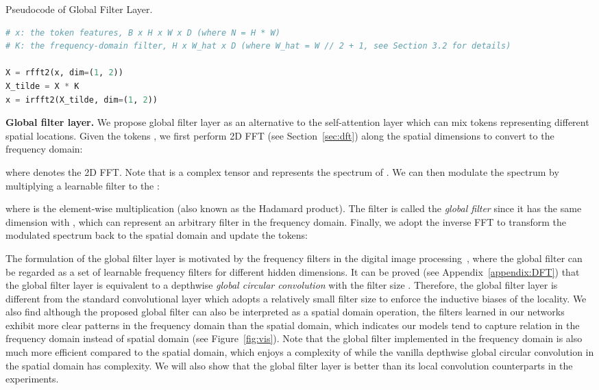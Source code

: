 \documentclass{article}
\makeatletter
\numberwithin{equation}{section}
\newcommand{\paragrapha}[2][1pt]{\vspace{#1}\noindent\textbf{#2}}
\let\@algcomment\relax
\newcommand\algcomment[1]{\def\@algcomment{\footnotesize#1}}
\makeatother
\begin{document}
\begin{algorithm}[t]
\caption{Pseudocode of Global Filter Layer.}
\label{alg:code}
\algcomment{\fontsize{7.2pt}{0em}\selectfont \texttt{rfft2/irfft2}: 2D FFT/IFFT for real signal
}
\begin{lstlisting}[language=python]
# x: the token features, B x H x W x D (where N = H * W)
# K: the frequency-domain filter, H x W_hat x D (where W_hat = W // 2 + 1, see Section 3.2 for details)

X = rfft2(x, dim=(1, 2))
X_tilde = X * K
x = irfft2(X_tilde, dim=(1, 2))

\end{lstlisting}
\end{algorithm}

\paragrapha{Global filter layer.} We propose global filter layer as an alternative to the self-attention layer which can mix tokens representing different spatial locations. Given the tokens , we first perform 2D FFT (see Section~\ref{sec:dft}) along the spatial dimensions to convert  to the frequency domain:

where  denotes the 2D FFT. Note that  is a complex tensor and represents the spectrum of . We can then modulate the spectrum by multiplying a learnable filter  to the :

where  is the element-wise multiplication (also known as the Hadamard product). The filter  is called the \emph{global filter} since it has the same dimension with , which can represent an arbitrary filter in the frequency domain. Finally, we adopt the inverse FFT to transform the modulated spectrum  back to the spatial domain and update the tokens:

The formulation of the global filter layer is motivated by the frequency filters in the digital image processing~\cite{pitas2000digital}, where the global filter  can be regarded as a set of learnable frequency filters for different hidden dimensions. It can be proved (see Appendix~\ref{appendix:DFT}) that the global filter layer is equivalent to a depthwise \emph{global circular convolution} with the filter size . Therefore, the global filter layer is different from the standard convolutional layer which adopts a relatively small filter size to enforce the inductive biases of the locality. We also find although the proposed global filter can also be interpreted as a spatial domain operation, the filters learned in our networks exhibit more clear patterns in the frequency domain than the spatial domain, which indicates our models tend to capture relation in the frequency domain instead of spatial domain (see Figure~\ref{fig:vis}).  Note that the global filter implemented in the frequency domain is also much more efficient compared to the spatial domain, which enjoys a complexity of  while the vanilla depthwise global circular convolution in the spatial domain has  complexity.  We will also show that the global filter layer is better than its local convolution counterparts in the experiments. 
\end{document}
